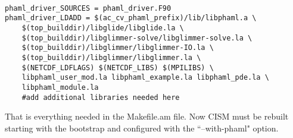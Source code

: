 \begin{framecode}{6in}
\begin{verbatim}

phaml_driver_SOURCES = phaml_driver.F90 
phaml_driver_LDADD = $(ac_cv_phaml_prefix)/lib/libphaml.a \
    $(top_builddir)/libglide/libglide.la \
    $(top_builddir)/libglimmer-solve/libglimmer-solve.la \
    $(top_builddir)/libglimmer/libglimmer-IO.la \
    $(top_builddir)/libglimmer/libglimmer.la \
    $(NETCDF_LDFLAGS) $(NETCDF_LIBS) $(MPILIBS) \
    libphaml_user_mod.la libphaml_example.la libphaml_pde.la \
    libphaml_module.la
    #add additional libraries needed here

\end{verbatim}
\end{framecode}

That is everything needed in the Makefile.am file.  Now CISM must be rebuilt starting with the bootstrap and configured with the ``--with-phaml" option.

